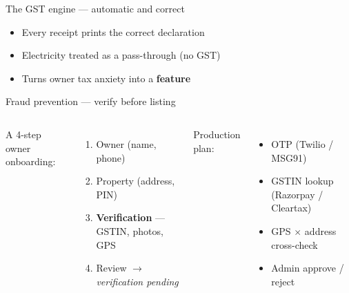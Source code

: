 \documentclass[aspectratio=169]{beamer}
\begin{document}
\begin{frame}{The GST engine — automatic and correct}
  \begin{center}
  \end{center}
  \begin{itemize}
    \item Every receipt prints the correct declaration
    \item Electricity treated as a pass-through (no GST)
    \item Turns owner tax anxiety into a \textbf{feature}
  \end{itemize}
\end{frame}

\begin{frame}{Fraud prevention — verify before listing}
  \begin{columns}
      A 4-step owner onboarding:
      \begin{enumerate}
        \item Owner (name, phone)
        \item Property (address, PIN)
        \item \textbf{Verification} — GSTIN, photos, GPS
        \item Review $\rightarrow$ \emph{verification pending}
      \end{enumerate}
      Production plan:
      \begin{itemize}
        \item OTP (Twilio / MSG91)
        \item GSTIN lookup (Razorpay / Cleartax)
        \item GPS $\times$ address cross-check
        \item Admin approve / reject
      \end{itemize}
  \end{columns}
\end{frame}
\end{document}
